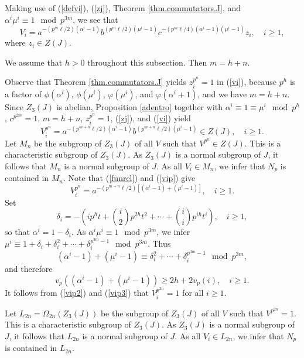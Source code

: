 \documentclass{amsart}
\theoremstyle{definition}
\theoremstyle{remark}
\begin{document}
Making use of (\ref{defvi}), (\ref{zj}), Theorem \ref{thm.commutators.J}, and $\alpha^i\mu^i\equiv 1\mod p^{3m}$, we see that
\begin{equation}
\label{vi}
V_i=a^{-(p^m\ell/2)(\alpha^i-1)} b^{(p^m\ell/2)(\mu^i-1)} c^{-(p^m\ell/4)(\alpha^i-1)(\mu^i-1)} z_i, \quad i\geq 1,
\end{equation}
where $z_i\in Z(J)$. 

\medskip

 We assume that $h>0$ throughout this subsection. Then $m=h+n$.

Observe that Theorem \ref{thm.commutators.J} yields $z_i^{p^n}=1$ in (\ref{vi}), because
$p^h$ is a factor of $\phi(\alpha^i)$, $\phi(\mu^i)$, $\varphi(\mu^i)$, and $\varphi(\alpha^i+1)$,
and we have $m=h+n$. Since $Z_3(J)$ is abelian, Proposition \ref{adentro} together with
$\alpha^i\equiv 1\equiv\mu^i\mod p^h$, $c^{p^{2m}}=1$, $m=h+n$, 
$z_i^{p^n}=1$, (\ref{zj}), and (\ref{vi}) yield
\begin{equation}
\label{vip}
V_i^{p^n}=a^{-(p^{m+n}\ell/2)(\alpha^i-1)} b^{(p^{m+n}\ell/2)(\mu^i-1)}\in Z(J),\quad i\geq 1.
\end{equation}
Let $M_{n}$ be the subgroup of $Z_3(J)$ of all
$V$ such that $V^{p^{n}}\in Z(J)$. This is a characteristic subgroup of $Z_3(J)$. As 
$Z_3(J)$ is a normal subgroup of $J$, it follows that $M_n$ is a normal subgroup of $J$.
As all $V_i\in M_n$, we infer that $N_p$ is contained in $M_{n}$. Note that (\ref{funrel}) and (\ref{vip}) give
\begin{equation}
\label{vip2}
V_i^{p^n}=a^{-(p^{m+n}\ell/2)[(\alpha^i-1)+(\mu^i-1)]},\quad i\geq 1.
\end{equation}
Set
$$
\delta_i=-(i p^h t+ \binom{i}{2} p^{2h} t^2+\cdots+ \binom{i}{i} p^{ih} t^i),\quad i\geq 1,
$$
so that
$
\alpha^i=1-\delta_i.
$
As $\alpha^i\mu^i\equiv 1\mod p^{3m}$, we infer
$
\mu^i\equiv 1+\delta_i+\delta_i^2+\cdots+\delta_i^{p^{3m}-1}\mod p^{3m}.
$
Thus
\begin{equation}
\label{cru}
(\alpha^i-1)+(\mu^i-1)\equiv \delta_i^2+\cdots+\delta_i^{p^{3m}-1}\mod p^{3m},
\end{equation}
and therefore
\begin{equation}
\label{vip3}
v_p((\alpha^i-1)+(\mu^i-1))\geq 2h+2v_p(i),\quad i\geq 1.
\end{equation}
It follows from (\ref{vip2}) and (\ref{vip3}) that
$V_i^{p^{2n}}=1$ for all $i\geq 1$.

Let $L_{2n}=\Omega_{2n}(Z_3(J))$ be the subgroup of $Z_3(J)$ of all
$V$ such that $V^{p^{2n}}=1$. This is a characteristic subgroup of $Z_3(J)$. As 
$Z_3(J)$ is a normal subgroup of $J$, it follows that $L_{2n}$ is a normal subgroup of $J$.
As all $V_i\in L_{2n}$, we infer that $N_p$ is contained in $L_{2n}$.
\end{document}
